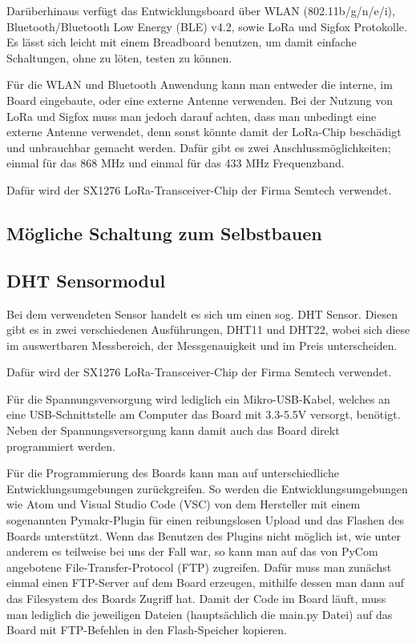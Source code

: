 Darüberhinaus verfügt das Entwicklungsboard über WLAN (802.11b/g/n/e/i), Bluetooth/Bluetooth Low Energy (BLE) v4.2, sowie LoRa und Sigfox Protokolle.  
Es lässt sich leicht mit einem Breadboard benutzen, um damit einfache Schaltungen, ohne zu löten, testen zu können. 

Für die WLAN und Bluetooth Anwendung kann man entweder die interne, im Board eingebaute, oder eine externe Antenne verwenden. Bei der Nutzung von LoRa und Sigfox muss man jedoch darauf achten, dass man unbedingt eine externe Antenne verwendet, denn sonst könnte damit der LoRa-Chip beschädigt und unbrauchbar gemacht werden. Dafür gibt es zwei Anschlussmöglichkeiten; einmal für das 868 MHz und einmal für das 433 MHz Frequenzband. 

Dafür wird der SX1276 LoRa-Transceiver-Chip der Firma Semtech verwendet.

\subsection{Mögliche Schaltung zum Selbstbauen} \label{LoPy4}

\subsection{DHT Sensormodul} \label{DHT}

Bei dem verwendeten Sensor handelt es sich um einen sog. DHT Sensor. Diesen gibt es in zwei verschiedenen Ausführungen, DHT11 und DHT22, wobei sich diese im auswertbaren Messbereich, der Messgenauigkeit und im Preis unterscheiden.

Dafür wird der SX1276 LoRa-Transceiver-Chip der Firma Semtech verwendet. 

Für die Spannungsversorgung wird lediglich ein Mikro-USB-Kabel, welches an eine USB-Schnittstelle am Computer das Board mit 3.3-5.5V versorgt, benötigt. Neben der Spannungsversorgung kann damit auch das Board direkt programmiert werden. 

Für die Programmierung des Boards kann man auf unterschiedliche Entwicklungsumgebungen zurückgreifen. So werden die Entwicklungsumgebungen wie Atom und Visual Studio Code (VSC) von dem Hersteller mit einem sogenannten Pymakr-Plugin für einen reibungslosen Upload und das Flashen des Boards unterstützt. Wenn das Benutzen des Plugins nicht möglich ist, wie unter anderem es teilweise bei uns der Fall war, so kann man auf das von PyCom angebotene File-Transfer-Protocol (FTP) zugreifen. Dafür muss man zunächst einmal einen FTP-Server auf dem Board erzeugen, mithilfe dessen man dann auf das Filesystem des Boards Zugriff hat. Damit der Code im Board läuft, muss man lediglich die jeweiligen Dateien (hauptsächlich die main.py Datei) auf das Board mit FTP-Befehlen in den Flash-Speicher kopieren. 

